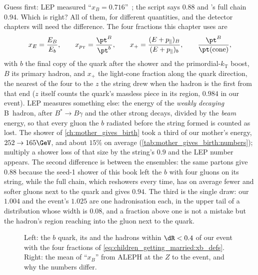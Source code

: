 Guess first: LEP measured ``$x_B=0.716$''~\cite{ALEPH:2001pfo}; the script
says $0.88$ and \PYTHIA's full chain $0.94$. Which is right? All of them,
for different quantities, and the detector chapters will need the
difference. The four fractions this chapter uses are
\begin{equation}
  \xE=\frac{E_B}{E_b},\qquad
  \xpt=\frac{\pt^B}{\pt^b},\qquad
  x_+=\frac{(E+p_\parallel)_B}{(E+p_\parallel)_b},\qquad
  \frac{\pt^B}{\pt(\text{cone})},
  \label{eq:children_getting_married:xb_defs}
\end{equation}
with $b$ the final copy of the quark after the shower and the
primordial-$k_{\mathrm{T}}$ boost, $B$ its primary hadron, and $x_+$ the
light-cone fraction along the quark direction, the nearest of the four to
the $z$ the string drew when the hadron is the first from that end ($z$
itself counts the quark's massless piece in its region, $0.984$ in our
event). LEP measures
something else: the energy of the \emph{weakly decaying} B~hadron, after
$B^*\to B\gamma$ and the other strong decays, divided by the \emph{beam}
energy, so that every gluon the $b$ radiated before the string formed is
counted as lost. The shower of \cref{ch:mother_gives_birth} took a third of
our mother's energy, $252\to165\GeV$, and about $15\%$ on average
(\cref{tab:mother_gives_birth:numbers}); multiply a shower loss of that
size by the string's $0.9$ and the LEP number appears. The second
difference is between the ensembles: the same partons give $0.88$ because
the seed-1 shower of this book left the $b$ with four gluons on its
string, while the full chain, which reshowers every time, has on average
fewer and softer gluons next to the quark and gives $0.94$. The third is
the single draw: our $1.004$ and the \CMSSW event's $1.025$ are one
hadronisation each, in the upper tail of a distribution whose width is
$0.08$, and a fraction above one is not a mistake but the hadron's region
reaching into the gluon next to the quark.

\begin{figure}[htbp]\centering
\resizebox{\textwidth}{!}{}
\caption[The definitions of $x_B$ and its values in different
settings]{Left: the $b$ quark, its \Bstarbar and the hadrons within
$\dR<0.4$ of our event with the four fractions of
\cref{eq:children_getting_married:xb_defs}. Right: the mean of ``$x_B$''
from ALEPH at the $Z$ to the \CMSSW event, and why the numbers differ.}
\label{fig:children_getting_married:xb_sketch}
\end{figure}

